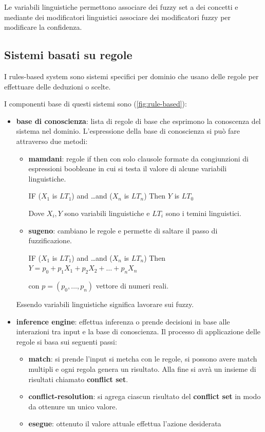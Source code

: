 Le variabili linguistiche permettono associare dei fuzzy set a dei concetti e 
mediante dei modificatori linguistici associare dei modificatori fuzzy per modificare 
la confidenza.

\subsection{Sistemi basati su regole}
I rules-based system sono sistemi specifici per dominio che usano delle regole 
per effettuare delle deduzioni o scelte.

I componenti base di questi sistemi sono (\ref{fig:rule-based}):
\begin{itemize}
    \item \textbf{base di conoscienza}: lista di regole di base che esprimono la 
    conoscenza del sistema nel dominio. L'espressione della base di conoscienza 
    si può fare attraverso due metodi:
    \begin{itemize}
        \item \textbf{mamdani}: regole if then con solo clausole formate da congiunzioni
        di espressioni boobleane in cui si testa il valore di alcune variabili linguistiche.
        \begin{center}
            IF ($X_1$ is $LT_1$) and \dots and ($X_n$ is $LT_n$) Then $Y$ is $LT_0$
        \end{center}
        Dove $X_i, Y$ sono variabili linguistiche e $LT_i$ sono i temini linguistici.
        \item  \textbf{sugeno}: cambiano le regole e permette di saltare il passo 
        di fuzzificazione.
        \begin{center}
            IF ($X_1$ is $LT_1$) and \dots and ($X_n$ is $LT_n$) Then $Y =p_0 + p_1X_1+ p_2X_2+\dots+ p_nX_n$
        \end{center}
        con $p=(p_0,\dots,p_n)$ vettore di numeri reali.
    \end{itemize}
    Essendo variabili linguistiche significa lavorare sui fuzzy.
    \item \textbf{inference engine}: effettua inferenza o prende decisioni in base alle interazioni 
    tra input e la base di conoscienza. Il processo di applicazione delle regole 
    si basa sui seguenti passi:
    \begin{itemize}
        \item \textbf{match}: si prende l'input si metcha con le regole, si possono 
        avere match multipli e ogni regola genera un risultato. Alla fine si avrà 
        un insieme di risultati chiamato \textbf{conflict set}.
        \item \textbf{conflict-resolution}: si agrega ciascun risultato del 
        \textbf{conflict set} in modo da ottenure un unico valore.
        \item \textbf{esegue}: ottenuto il valore attuale effettua l'azione 
        desiderata
    \end{itemize}
\end{itemize}

